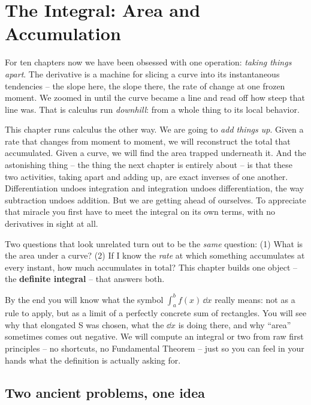 \chapter{The Integral: Area and Accumulation}

For ten chapters now we have been obsessed with one operation: \emph{taking
things apart}. The derivative is a machine for slicing a curve into its
instantaneous tendencies -- the slope here, the slope there, the rate of change
at one frozen moment. We zoomed in until the curve became a line and read off
how steep that line was. That is calculus run \emph{downhill}: from a whole
thing to its local behavior.

This chapter runs calculus the other way. We are going to \emph{add things up}.
Given a rate that changes from moment to moment, we will reconstruct the total
that accumulated. Given a curve, we will find the area trapped underneath it.
And the astonishing thing -- the thing the next chapter is entirely about -- is
that these two activities, taking apart and adding up, are exact inverses of one
another. Differentiation undoes integration and integration undoes
differentiation, the way subtraction undoes addition. But we are getting ahead
of ourselves. To appreciate that miracle you first have to meet the integral on
its own terms, with no derivatives in sight at all.

\begin{focusbox}
Two questions that look unrelated turn out to be the \emph{same} question:
(1) What is the area under a curve? (2) If I know the \emph{rate} at which
something accumulates at every instant, how much accumulates in total? This
chapter builds one object -- the \textbf{definite integral} -- that answers both.
\end{focusbox}

By the end you will know what the symbol $\int_a^b f(x)\,\dd x$ really means: not
as a rule to apply, but as a limit of a perfectly concrete sum of rectangles.
You will see why that elongated S was chosen, what the $\dd x$ is doing there,
and why ``area'' sometimes comes out negative. We will compute an integral or
two from raw first principles -- no shortcuts, no Fundamental Theorem -- just so
you can feel in your hands what the definition is actually asking for.

\chapterline

\section{Two ancient problems, one idea}
\label{ch20:two-problems}


